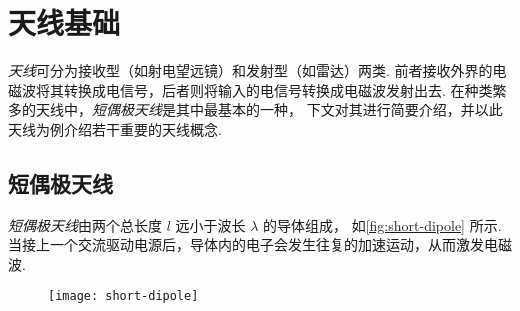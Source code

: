 \section{天线基础}
\label{sec:antenna}

\emph{天线}可分为接收型（如射电望远镜）和发射型（如雷达）两类.
前者接收外界的电磁波将其转换成电信号，后者则将输入的电信号转换成电磁波发射出去.
在种类繁多的天线中，\emph{短偶极天线}是其中最基本的一种，
下文对其进行简要介绍，并以此天线为例介绍若干重要的天线概念.

\subsection{短偶极天线}

\emph{短偶极天线}由两个总长度 $l$ 远小于波长 $\lambda$ 的导体组成，
如\autoref{fig:short-dipole} 所示.
当接上一个交流驱动电源后，导体内的电子会发生往复的加速运动，从而激发电磁波.

\begin{figure}[htp]
  \centering
  \texttt{[image: short-dipole]}
  \label{fig:short-dipole}
\end{figure}

